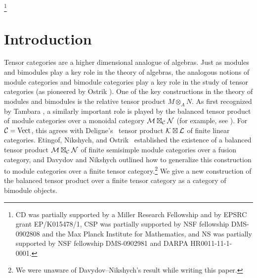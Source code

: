 \documentclass{amsart}
\begin{document}
\thanks{CD was partially supported by a Miller Research Fellowship and by EPSRC grant EP/K015478/1, CSP was partially supported by NSF fellowship DMS-0902808 and the Max Planck Institute for Mathematics, and NS was partially supported by NSF fellowship DMS-0902981 and DARPA HR0011-11-1-0001.
}


\maketitle	

\tikzexternaldisable


\section{Introduction}

Tensor categories are a higher dimensional analogue of algebras.  Just as modules and bimodules play a key role in the theory of algebras, the analogous notions of module categories and bimodule categories play a key role in the study of tensor categories (as pioneered by Ostrik \cite{MR1976459}).  One of the key constructions in the theory of modules and bimodules is the relative tensor product $M \otimes_A N$.  As first recognized by Tambara \cite{tambara}, a similarly important role is played by the balanced tensor product of module categories over a monoidal category $\mathcal M \boxtimes_\mathcal C \mathcal N$ (for example, see \cite{MR1966524, 0909.3140, MR2511638, MR2909758, 1202.4396, MR3022755, MR3063919}).  For $\mathcal C = \mathrm{Vect}$, this agrees with Deligne's~\cite{MR1106898} tensor product $\mathcal K \boxtimes \mathcal L$ of finite linear categories.  Etingof, Nikshych, and Ostrik~\cite{0909.3140} established the existence of a balanced tensor product $\mathcal M \boxtimes_{\mathcal C} \mathcal N$ of finite semisimple module categories over a fusion category, and Davydov and Nikshych \cite[\S 2.7]{MR3107567} outlined how to generalize this construction to module categories over a finite tensor category.\footnote{We were unaware of Davydov--Nikshych's result while writing this paper.}  We give a new construction of the balanced tensor product over a finite tensor category as a category of bimodule objects.
\end{document}
